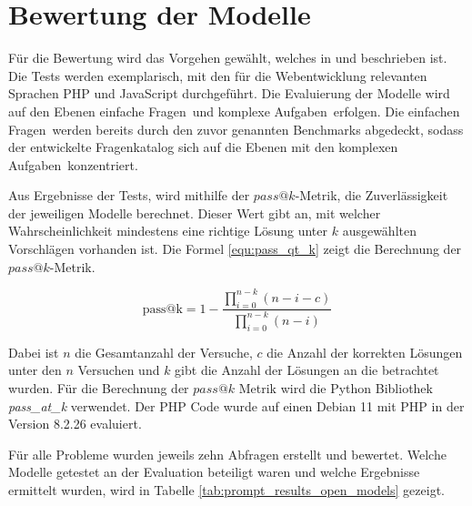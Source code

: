 \section{Bewertung der Modelle}
Für die Bewertung wird das Vorgehen gewählt, welches in \cite{chen-2021} und \cite{peng-2024} beschrieben ist. Die Tests werden exemplarisch, mit den für die Webentwicklung relevanten Sprachen PHP und JavaScript durchgeführt. Die Evaluierung der Modelle wird auf den Ebenen \glqq einfache Fragen\grqq \ und \glqq komplexe Aufgaben\grqq \ erfolgen. Die \glqq einfachen Fragen\grqq \ werden bereits durch den zuvor genannten Benchmarks abgedeckt, sodass der entwickelte Fragenkatalog sich auf die Ebenen mit den \glqq komplexen Aufgaben\grqq \ konzentriert.\vspace{0.2cm}

Aus Ergebnisse der Tests, wird mithilfe der $pass@k$-Metrik, die Zuverlässigkeit der jeweiligen Modelle berechnet. Dieser Wert gibt an, mit welcher Wahrscheinlichkeit mindestens eine richtige Lösung unter $k$ ausgewählten Vorschlägen vorhanden ist. Die Formel \ref{equ:pass_qt_k} zeigt die Berechnung der $pass@k$-Metrik.

\begin{equation}\label{equ:pass_qt_k}
	\text{pass@k} = 1 - \frac{\prod_{i=0}^{n-k} (n - i - c)}{\prod_{i=0}^{n-k} (n - i)}
\end{equation}

Dabei ist $n$ die Gesamtanzahl der Versuche, $c$ die Anzahl der korrekten Lösungen unter den $n$ Versuchen und $k$ gibt die Anzahl der Lösungen an die betrachtet wurden. Für die Berechnung der $pass@k$ Metrik wird die Python Bibliothek \textit{pass\_at\_k} verwendet. Der PHP Code wurde auf einen Debian 11 mit PHP in der Version 8.2.26 evaluiert.\vspace{0.2cm}

Für alle Probleme wurden jeweils zehn Abfragen erstellt und bewertet. Welche Modelle getestet an der Evaluation beteiligt waren und welche Ergebnisse ermittelt wurden, wird in Tabelle \ref{tab:prompt_results_open_models} gezeigt.

